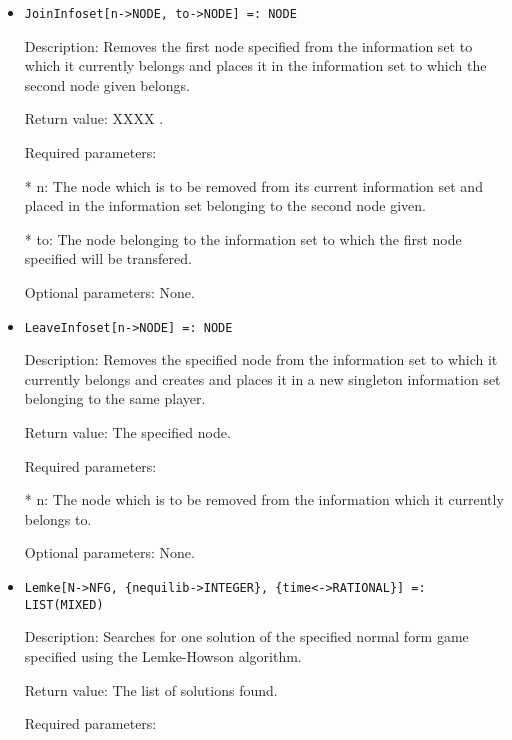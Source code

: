 \begin{itemize}
\item
\begin{verbatim}
JoinInfoset[n->NODE, to->NODE] =: NODE
\end{verbatim}

\bd
\item
[Description:] Removes the first node specified from the information set
to which it currently belongs and places it in the information set to
which the second node given belongs.
\item
[Return value:] XXXX .
\item
[Required parameters:]\hfil\null
	  
\bd
\item
[* n:] The node which is to be removed from its current information
set and placed in the information set belonging to the second
node given.
\item
[* to:] The node belonging to the information set to which the first
node specified will be transfered.
\ed

\item
[Optional parameters:] None.
\ed

\item
\begin{verbatim}
LeaveInfoset[n->NODE] =: NODE
\end{verbatim}

\bd
\item
[Description:] Removes the specified node from the information set to
which it currently belongs and creates and places it in a new singleton
information set belonging to the same player.
\item
[Return value:] The specified node.
\item
[Required parameters:]\hfil\null
	  
\bd
\item
[* n:] The node which is to be removed from the information which it
currently belongs to.
\ed

\item
[Optional parameters:] None.
\ed

\item
\begin{verbatim}
Lemke[N->NFG, {nequilib->INTEGER}, {time<->RATIONAL}] =: LIST(MIXED)
\end{verbatim}

\bd
\item
[Description:] Searches for one solution of the specified normal form 
game specified using the Lemke-Howson algorithm.  
\item
[Return value:] The list of solutions found.
\item
[Required parameters:]\hfil\null


\end{itemize}
